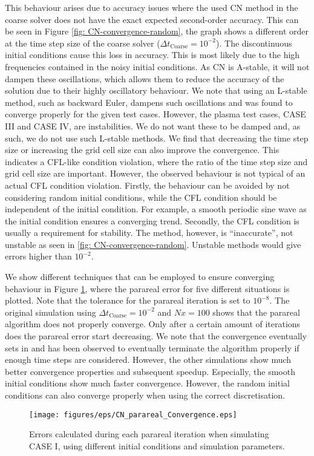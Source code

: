 This behaviour arises due to accuracy issues where the used CN method in the coarse solver does not have the exact expected second-order accuracy. This can be seen in Figure \ref{fig: CN-convergence-random}, the graph shows a different order at the time step size of the coarse solver ($\Delta t_\mathrm{Coarse} = 10^{-2}$). The discontinuous initial conditions cause this loss in accuracy. This is most likely due to the high frequencies contained in the noisy initial conditions. As CN is A-stable, it will not dampen these oscillations, which allows them to reduce the accuracy of the solution due to their highly oscillatory behaviour. We note that using an L-stable method, such as backward Euler, dampens such oscillations and was found to converge properly for the given test cases. However, the plasma test cases, CASE III and CASE IV, are instabilities. We do not want these to be damped and, as such, we do not use such L-stable methods. We find that decreasing the time step size or increasing the grid cell size can also improve the convergence. This indicates a CFL-like condition violation, where the ratio of the time step size and grid cell size are important. However, the observed behaviour is not typical of an actual CFL condition violation. Firstly, the behaviour can be avoided by not considering random initial conditions, while the CFL condition should be independent of the initial condition. For example, a smooth periodic sine wave as the initial condition ensures a converging trend. Secondly, the CFL condition is usually a requirement for stability. The method, however, is ``inaccurate'', not unstable as seen in \ref{fig: CN-convergence-random}. Unstable methods would give errors higher than  $10^{-2}$.

We show different techniques that can be employed to ensure converging behaviour in Figure \ref{fig: CN-parareal-convergence}, where the parareal error for five different situations is plotted. Note that the tolerance for the parareal iteration is set to $10^{-8}$. The original simulation using $\Delta t_\mathrm{Coarse} = 10^{-2}$ and $Nx = 100$ shows that the parareal algorithm does not properly converge. Only after a certain amount of iterations does the parareal error start decreasing. We note that the convergence eventually sets in and has been observed to eventually terminate the algorithm properly if enough time steps are considered. However, the other simulations show much better convergence properties and subsequent speedup. Especially, the smooth initial conditions show much faster convergence. However, the random initial conditions can also converge properly when using the correct discretisation. 
\begin{figure}[h]
    \centering
    \texttt{[image: figures/eps/CN\_parareal\_Convergence.eps]}
    \caption{Errors calculated during each parareal iteration when simulating CASE I, using different initial conditions and simulation parameters.}
    \label{fig: CN-parareal-convergence}
\end{figure}

